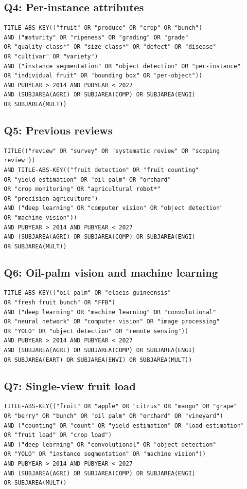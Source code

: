 \subsection*{Q4: Per-instance attributes}
\begin{verbatim}
TITLE-ABS-KEY(("fruit" OR "produce" OR "crop" OR "bunch")
AND ("maturity" OR "ripeness" OR "grading" OR "grade"
OR "quality class*" OR "size class*" OR "defect" OR "disease"
OR "cultivar" OR "variety")
AND ("instance segmentation" OR "object detection" OR "per-instance"
OR "individual fruit" OR "bounding box" OR "per-object"))
AND PUBYEAR > 2014 AND PUBYEAR < 2027
AND (SUBJAREA(AGRI) OR SUBJAREA(COMP) OR SUBJAREA(ENGI)
OR SUBJAREA(MULT))
\end{verbatim}

\subsection*{Q5: Previous reviews}
\begin{verbatim}
TITLE(("review" OR "survey" OR "systematic review" OR "scoping review"))
AND TITLE-ABS-KEY(("fruit detection" OR "fruit counting"
OR "yield estimation" OR "oil palm" OR "orchard"
OR "crop monitoring" OR "agricultural robot*"
OR "precision agriculture")
AND ("deep learning" OR "computer vision" OR "object detection"
OR "machine vision"))
AND PUBYEAR > 2014 AND PUBYEAR < 2027
AND (SUBJAREA(AGRI) OR SUBJAREA(COMP) OR SUBJAREA(ENGI)
OR SUBJAREA(MULT))
\end{verbatim}

\subsection*{Q6: Oil-palm vision and machine learning}
\begin{verbatim}
TITLE-ABS-KEY(("oil palm" OR "elaeis guineensis"
OR "fresh fruit bunch" OR "FFB")
AND ("deep learning" OR "machine learning" OR "convolutional"
OR "neural network" OR "computer vision" OR "image processing"
OR "YOLO" OR "object detection" OR "remote sensing"))
AND PUBYEAR > 2014 AND PUBYEAR < 2027
AND (SUBJAREA(AGRI) OR SUBJAREA(COMP) OR SUBJAREA(ENGI)
OR SUBJAREA(EART) OR SUBJAREA(ENVI) OR SUBJAREA(MULT))
\end{verbatim}

\subsection*{Q7: Single-view fruit load}
\begin{verbatim}
TITLE-ABS-KEY(("fruit" OR "apple" OR "citrus" OR "mango" OR "grape"
OR "berry" OR "bunch" OR "oil palm" OR "orchard" OR "vineyard")
AND ("counting" OR "count" OR "yield estimation" OR "load estimation"
OR "fruit load" OR "crop load")
AND ("deep learning" OR "convolutional" OR "object detection"
OR "YOLO" OR "instance segmentation" OR "machine vision"))
AND PUBYEAR > 2014 AND PUBYEAR < 2027
AND (SUBJAREA(AGRI) OR SUBJAREA(COMP) OR SUBJAREA(ENGI)
OR SUBJAREA(MULT))
\end{verbatim}
